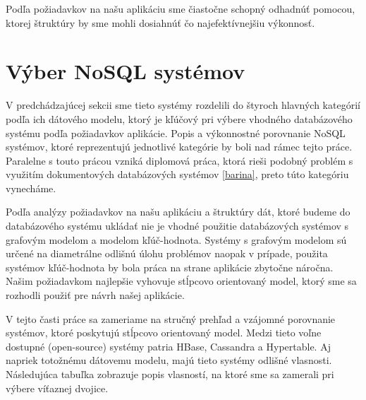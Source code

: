 \documentclass[11pt,twoside,a4paper]{book}
\begin{document}
Podľa požiadavkov na našu aplikáciu sme čiastočne schopný odhadnúť pomocou, ktorej štruktúry by sme mohli dosiahnúť čo najefektívnejšiu výkonnosť.



\section{Výber NoSQL systémov}

V predchádzajúcej sekcii sme tieto systémy rozdelili do štyroch hlavných kategórií podľa ich dátového modelu, ktorý je kľúčový pri výbere vhodného databázového systému podľa požiadavkov aplikácie. Popis a výkonnostné porovnanie NoSQL systémov, ktoré reprezentujú jednotlivé kategórie by boli nad rámec tejto práce. Paralelne s touto prácou vzniká diplomová práca, ktorá rieši podobný problém s využitím dokumentových databázových systémov  \ref{barina}, preto túto kategóriu vynecháme. 

Podľa analýzy požiadavkov na našu aplikáciu a štruktúry dát, ktoré budeme do databázového systému ukládať nie je vhodné použitie databázových systémov s grafovým modelom a modelom kľúč-hodnota. Systémy s grafovým modelom sú určené na diametrálne odlišnú úlohu problémov naopak v prípade, použita systémov kľúč-hodnota by bola práca na strane aplikácie zbytočne náročna. Našim požiadavkom najlepšie vyhovuje stĺpcovo orientovaný model, ktorý sme sa rozhodli použiť pre návrh našej aplikácie.

V tejto časti práce sa zameriame na stručný prehľad a vzájomné porovnanie systémov, ktoré poskytujú stĺpcovo orientovaný model. Medzi tieto voľne dostupné (open-source) systémy patria HBase, Cassandra a Hypertable. Aj napriek totožnému dátovemu modelu, majú tieto systémy odlišné vlasnosti. Následujúca tabuľka zobrazuje popis vlasností, na ktoré sme sa zamerali pri výbere víťaznej dvojice.
\end{document}
